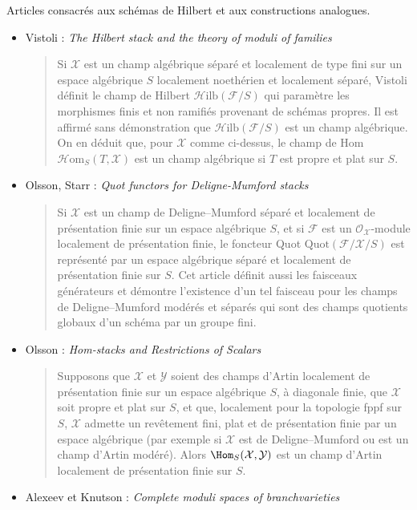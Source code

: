 \noindent
Articles consacrés aux schémas de Hilbert et aux constructions analogues.
\begin{itemize}
\item Vistoli : \emph{The Hilbert stack and the theory of moduli of families}
\cite{vistoli_hilbert}
\begin{quote}
Si $\mathcal{X}$ est un champ algébrique séparé et localement de type fini sur
un espace algébrique $S$ localement noethérien et localement séparé, Vistoli
définit le champ de Hilbert $\mathcal{H}\text{ilb}(\mathcal{F} / S)$ qui
paramètre les morphismes finis et non ramifiés provenant de schémas propres.
Il est affirmé sans démonstration que
$\mathcal{H}\text{ilb}(\mathcal{F} / S)$ est un champ algébrique. On en déduit
que, pour $\mathcal{X}$ comme ci-dessus, le champ de Hom
$\mathcal{H} \text{om}_S(T, \mathcal{X})$ est un champ algébrique si $T$ est
propre et plat sur $S$.
\end{quote}
\item Olsson, Starr : \emph{Quot functors for Deligne-Mumford stacks}
\cite{olsson-starr}
\begin{quote}
Si $\mathcal{X}$ est un champ de Deligne--Mumford séparé et localement de
présentation finie sur un espace algébrique $S$, et si $\mathcal{F}$ est un
$\mathcal{O}_\mathcal{X}$-module localement de présentation finie, le foncteur
Quot $\text{Quot}(\mathcal{F} / \mathcal{X} / S)$ est représenté par un espace
algébrique séparé et localement de présentation finie sur $S$. Cet article
définit aussi les faisceaux générateurs et démontre l'existence d'un tel
faisceau pour les champs de Deligne--Mumford modérés et séparés qui sont des
champs quotients globaux d'un schéma par un groupe fini.
\end{quote}
\item Olsson : \emph{Hom-stacks and Restrictions of Scalars}
\cite{olsson_homstacks}
\begin{quote}
Supposons que $\mathcal{X}$ et $\mathcal{Y}$ soient des champs d'Artin
localement de présentation finie sur un espace algébrique $S$, à diagonale
finie, que $\mathcal{X}$ soit propre et plat sur $S$, et que, localement pour
la topologie fppf sur $S$, $\mathcal{X}$ admette un revêtement fini, plat et de
présentation finie par un espace algébrique (par exemple si $\mathcal{X}$ est
de Deligne--Mumford ou est un champ d'Artin modéré). Alors
$\Hom_S(\mathcal{X}, \mathcal{Y})$ est un champ d'Artin localement de
présentation finie sur $S$.
\end{quote}
\item Alexeev et Knutson : \emph{Complete moduli spaces of branchvarieties}

\end{itemize}

